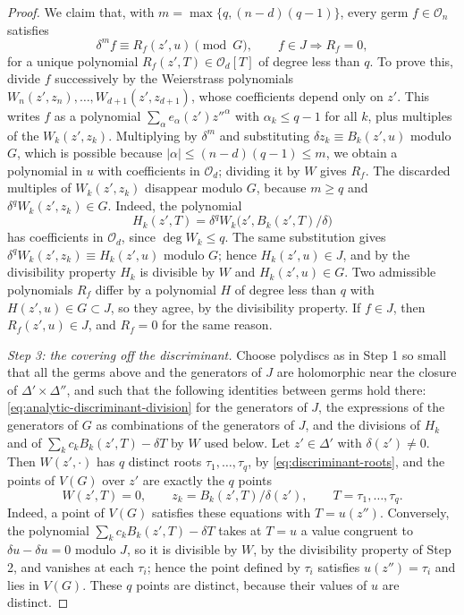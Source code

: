 \begin{proof}
We claim that, with $m=\max\{q,(n-d)(q-1)\}$, every germ $f\in\mathcal O_n$ satisfies
\begin{equation}\label{eq:analytic-discriminant-division}
 \delta^m f\equiv R_f(z',u)\pmod G,
 \qquad f\in J\Longrightarrow R_f=0,
\end{equation}
for a unique polynomial $R_f(z',T)\in\mathcal O_d[T]$ of degree less than $q$. To prove this, divide $f$ successively by the Weierstrass polynomials $W_n(z',z_n),\ldots,W_{d+1}(z',z_{d+1})$, whose coefficients depend only on $z'$. This writes $f$ as a polynomial $\sum_\alpha e_\alpha(z')z''^\alpha$ with $\alpha_k\leq q-1$ for all $k$, plus multiples of the $W_k(z',z_k)$. Multiplying by $\delta^m$ and substituting $\delta z_k\equiv B_k(z',u)$ modulo $G$, which is possible because $|\alpha|\leq(n-d)(q-1)\leq m$, we obtain a polynomial in $u$ with coefficients in $\mathcal O_d$; dividing it by $W$ gives $R_f$. The discarded multiples of $W_k(z',z_k)$ disappear modulo $G$, because $m\geq q$ and $\delta^qW_k(z',z_k)\in G$. Indeed, the polynomial
\[
 H_k(z',T)=\delta^qW_k\bigl(z',B_k(z',T)/\delta\bigr)
\]
has coefficients in $\mathcal O_d$, since $\deg W_k\leq q$. The same substitution gives $\delta^qW_k(z',z_k)\equiv H_k(z',u)$ modulo $G$; hence $H_k(z',u)\in J$, and by the divisibility property $H_k$ is divisible by $W$ and $H_k(z',u)\in G$. Two admissible polynomials $R_f$ differ by a polynomial $H$ of degree less than $q$ with $H(z',u)\in G\subset J$, so they agree, by the divisibility property. If $f\in J$, then $R_f(z',u)\in J$, and $R_f=0$ for the same reason.

\emph{Step 3: the covering off the discriminant.} Choose polydiscs as in Step 1 so small that all the germs above and the generators of $J$ are holomorphic near the closure of $\Delta'\times\Delta''$, and such that the following identities between germs hold there: \eqref{eq:analytic-discriminant-division} for the generators of $J$, the expressions of the generators of $G$ as combinations of the generators of $J$, and the divisions of $H_k$ and of $\sum_kc_kB_k(z',T)-\delta T$ by $W$ used below. Let $z'\in\Delta'$ with $\delta(z')\neq0$. Then $W(z',\cdot)$ has $q$ distinct roots $\tau_1,\ldots,\tau_q$, by \eqref{eq:discriminant-roots}, and the points of $V(G)$ over $z'$ are exactly the $q$ points
\[
 W(z',T)=0,\qquad z_k=B_k(z',T)/\delta(z'),\qquad T=\tau_1,\ldots,\tau_q.
\]
Indeed, a point of $V(G)$ satisfies these equations with $T=u(z'')$. Conversely, the polynomial $\sum_kc_kB_k(z',T)-\delta T$ takes at $T=u$ a value congruent to $\delta u-\delta u=0$ modulo $J$, so it is divisible by $W$, by the divisibility property of Step 2, and vanishes at each $\tau_i$; hence the point defined by $\tau_i$ satisfies $u(z'')=\tau_i$ and lies in $V(G)$. These $q$ points are distinct, because their values of $u$ are distinct.


\end{proof}
